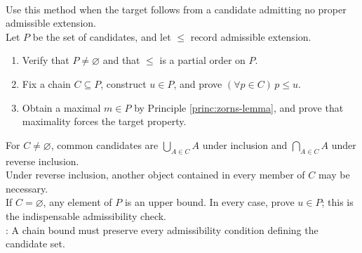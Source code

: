 \begin{proofmethod} \label{meth:zorn-maximality-template} \\
Use this method when the target follows from a candidate admitting no proper admissible extension.\\
Let $P$ be the set of candidates, and let $\leq$ record admissible extension.
\begin{enumerate}[label=(\roman*)]
\setlength{\itemsep}{0pt}
\item Verify that $P\neq\varnothing$ and that $\leq$ is a partial order on $P$.
\item Fix a chain $C\subseteq P$, construct $u\in P$, and prove $(\forall p\in C)\,p\leq u$.
\item Obtain a maximal $m\in P$ by Principle \ref{princ:zorns-lemma}, and prove that maximality forces the target property.
\end{enumerate}
For $C\neq\varnothing$, common candidates are $\bigcup\limits_{A\in C}A$ under inclusion and $\bigcap\limits_{A\in C}A$ under reverse inclusion.\\
Under reverse inclusion, another object contained in every member of $C$ may be necessary.\\
If $C=\varnothing$, any element of $P$ is an upper bound. In every case, prove $u\in P$; this is the indispensable admissibility check.\\
: A chain bound must preserve every admissibility condition defining the candidate set.
\end{proofmethod}
